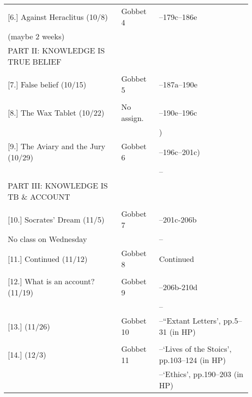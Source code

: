\documentclass[article,oneside]{memoir}
\begin{document}
\begin{center}
\begin{longtable}{p{4.5cm}p{2cm}p{6cm}}
[6.] Against Heraclitus (10/8)	   		& Gobbet 4		 & --179c--186e    \\
(maybe 2 weeks)			        					& 				 & \\ [1.8\baselineskip]
								
PART II: KNOWLEDGE IS TRUE BELIEF					& 				 & 	\\
								& 				 &   \\ [1.8\baselineskip]									
  
[7.] False belief (10/15)			 	& Gobbet 5		& --187a--190e  \\
				     			 	& 	      			&  \\  [1.8\baselineskip]



[8.] The Wax Tablet	(10/22)			& No assign.		& --190e--196c\\
	            						&		      		& ) \\  [1.8\baselineskip]

[9.] The Aviary and the Jury	(10/29)	& Gobbet 6		& --196c--201c) \\
		            					&		      		& --\\  [1.8\baselineskip]
							
PART III: KNOWLEDGE IS TB \& ACCOUNT				& 				 & 	\\
								& 				 &   \\ [1.8\baselineskip]								


[10.] Socrates' Dream (11/5)			& Gobbet 7		& --201c-206b \\
No class on Wednesday			    					& 				& -- \\ [1.8\baselineskip]


[11.] Continued (11/12)				& Gobbet 8		& Continued \\ 
				   			   	&			      	&   \\ [1.8\baselineskip]

						
[12.] What is an account? (11/19)	      	& Gobbet 9		&  --206b-210d \\
				   			   	&			      	& --\\  [1.8\baselineskip]

						 
[13.]  (11/26)	    				& Gobbet 10		& --``Extant Letters', pp.5--31 (in HP)\\
			      					&			      	&  \\ [1.8\baselineskip]

[14.] 	(12/3)			  	& Gobbet 11		&--`Lives of the Stoics', pp.103--124 (in HP) \\ 
			    				  	&		      		& --`Ethics', pp.190--203 (in HP) \\[1.8\baselineskip]


\end{longtable}
\end{center}
\end{document}
